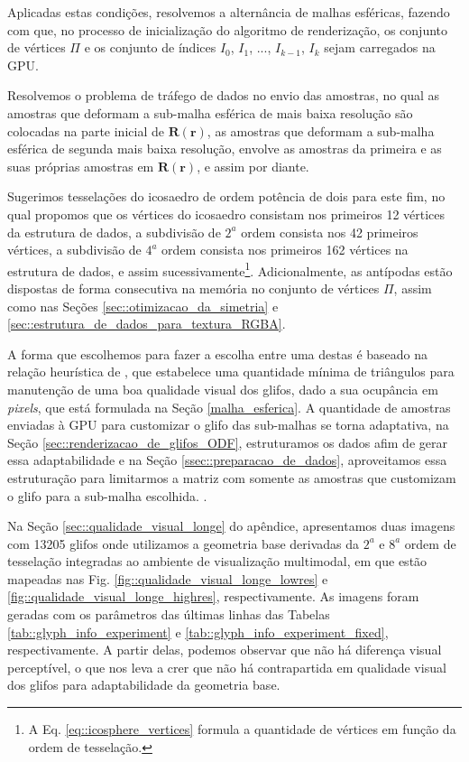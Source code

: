 \documentclass[
    12pt,                %
    oneside,            %
    a4paper,            %
    english,            %
    french,                %
    spanish,            %
    brazil                %
    ]{abntex2}
\begin{document}
Aplicadas estas condições, resolvemos a alternância de malhas esféricas, fazendo com que, no processo de inicialização do algoritmo de renderização, os conjunto de vértices $\Pi$ e os conjunto de índices $I_0$, $I_1$, ..., $I_{k-1}$, $I_k$ sejam carregados na GPU.

Resolvemos o problema de tráfego de dados no envio das amostras, no qual as amostras que deformam a sub-malha esférica de mais baixa resolução são colocadas na parte inicial de $\boldsymbol{R}(\mathbf{r})$, as amostras que deformam a sub-malha esférica de segunda mais baixa resolução, envolve as amostras da primeira e as suas próprias amostras em $\boldsymbol{R(\mathbf{r})}$, e assim por diante.

Sugerimos tesselações do icosaedro de ordem potência de dois para este fim, no qual propomos que os vértices do icosaedro consistam nos primeiros 12 vértices da estrutura de dados, a subdivisão de $2^a$ ordem consista nos 42 primeiros vértices, a subdivisão de $4^a$ ordem consista nos primeiros 162 vértices na estrutura de dados, e assim sucessivamente\footnote{A Eq. \ref{eq::icosphere_vertices} formula a quantidade de vértices em função da ordem de tesselação.}. Adicionalmente, as antípodas estão dispostas de forma consecutiva na memória no conjunto de vértices $\Pi$, assim como nas Seções \ref{sec::otimizacao_da_simetria} e \ref{sec::estrutura_de_dados_para_textura_RGBA}.

A forma que escolhemos para fazer a escolha entre uma destas é baseado na relação heurística de , que estabelece uma quantidade mínima de triângulos para manutenção de uma boa qualidade visual dos glifos, dado a sua ocupância em \textit{pixels}, que está formulada na Seção %
\ref{malha_esferica}. A quantidade de amostras enviadas à GPU para customizar o glifo das sub-malhas se torna adaptativa, na Seção \ref{sec::renderizacao_de_glifos_ODF}, estruturamos os dados afim de gerar essa adaptabilidade e na Seção \ref{ssec::preparacao_de_dados}, aproveitamos essa estruturação para limitarmos a matriz com somente as amostras que customizam o glifo para a sub-malha escolhida.
.

Na Seção \ref{sec::qualidade_visual_longe} do apêndice, apresentamos duas imagens com 13205 glifos onde utilizamos a geometria base derivadas da $2^a$ e $8^a$ ordem de tesselação integradas ao ambiente de visualização multimodal, em que estão mapeadas nas Fig. \ref{fig::qualidade_visual_longe_lowres} e \ref{fig::qualidade_visual_longe_highres}, respectivamente. As imagens foram geradas com os parâmetros das últimas linhas das Tabelas \ref{tab::glyph_info_experiment} e \ref{tab::glyph_info_experiment_fixed}, respectivamente. A partir delas, podemos observar que não há diferença visual perceptível, o que nos leva a crer que não há contrapartida em qualidade visual dos glifos para adaptabilidade da geometria base.
\end{document}
